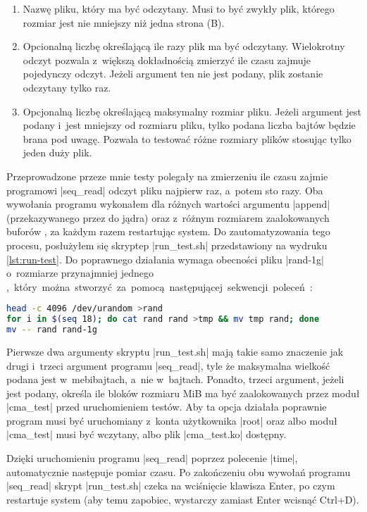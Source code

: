 \begin{enumerate}
\item Nazwę pliku, który ma być odczytany.  Musi to być zwykły plik,
  którego rozmiar jest nie mniejszy niż jedna strona (\unit[4096]{B}).
\item Opcionalną liczbę określającą ile razy plik ma być odczytany.
  Wielokrotny odczyt pozwala z~większą dokładnością zmierzyć ile czasu
  zajmuje pojedynczy odczyt.  Jeżeli argument ten nie jest podany,
  plik zostanie odczytany tylko raz.
\item Opcjonalną liczbę określającą maksymalny rozmiar pliku.  Jeżeli
  argument jest podany i~jest mniejszy od rozmiaru pliku, tylko podana
  liczba bajtów będzie brana pod uwagę.  Pozwala to testować różne
  rozmiary plików stosując tylko jeden duży plik.
\end{enumerate}

Przeprowadzone przeze mnie testy polegały na zmierzeniu ile czasu
zajmie programowi \code|seq_read| odczyt pliku najpierw raz, a~potem
sto razy.  Oba wywołania programu wykonałem dla różnych wartości
argumentu \code|append| (przekazywanego przez  do jądra)
oraz z~różnym rozmiarem zaalokowanych buforów , za każdym
razem restartując system.  Do zautomatyzowania tego procesu,
posłużyłem się skryptep \code|run_test.sh| przedstawiony na wydruku
\ref{lst:run-test}.  Do poprawnego działania wymaga obecności pliku
\code|rand-1g| o~rozmiarze przynajmniej jednego \unit[GiB], który
można stworzyć za pomocą następującej sekwencji poleceń:

\begin{lstlisting}[language=sh,numbers=none]
head -c 4096 /dev/urandom >rand
for i in $(seq 18); do cat rand rand >tmp && mv tmp rand; done
mv -- rand rand-1g
\end{lstlisting}

Pierwsze dwa argumenty skryptu \code|run_test.sh| mają takie samo
znaczenie jak drugi i~trzeci argument programu \code|seq_read|, tyle
że maksymalna wielkość podana jest w~mebibajtach, a~nie w~bajtach.
Ponadto, trzeci argument, jeżeli jest podany, określa ile bloków
rozmiaru \unit[128]{MiB} ma być zaalokowanych przez moduł
\code|cma_test| przed uruchomieniem testów.  Aby ta opcja działała
poprawnie program musi być uruchomiany z~konta użytkownika \code|root|
oraz albo moduł \code|cma_test| musi być wczytany, albo plik
\code|cma_test.ko| dostępny.

Dzięki uruchomieniu programu \code|seq_read| poprzez polecenie
\code|time|, automatycznie następuje pomiar czasu.  Po zakończeniu obu
wywołań programu \code|seq_read| skrypt \code|run_test.sh| czeka na
wciśnięcie klawisza Enter, po czym restartuje system (aby temu
zapobiec, wystarczy zamiast Enter wcisnąć Ctrl+D).

